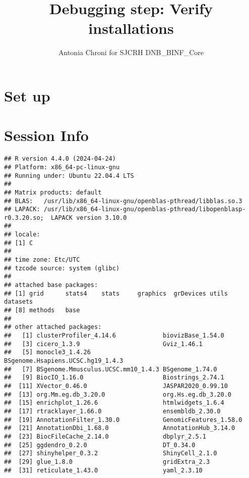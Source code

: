 \documentclass[
  11pt,
  a4paper,
]{article}
\title{Debugging step: Verify installations}
\author{Antonia Chroni for SJCRH DNB\_BINF\_Core}
\date{}
\begin{document}
\maketitle

{
\hypersetup{linkcolor=}
\setcounter{tocdepth}{2}
\tableofcontents
}
\section{Set up}\label{set-up}

\section{Session Info}\label{session-info}

\begin{verbatim}
## R version 4.4.0 (2024-04-24)
## Platform: x86_64-pc-linux-gnu
## Running under: Ubuntu 22.04.4 LTS
## 
## Matrix products: default
## BLAS:   /usr/lib/x86_64-linux-gnu/openblas-pthread/libblas.so.3 
## LAPACK: /usr/lib/x86_64-linux-gnu/openblas-pthread/libopenblasp-r0.3.20.so;  LAPACK version 3.10.0
## 
## locale:
## [1] C
## 
## time zone: Etc/UTC
## tzcode source: system (glibc)
## 
## attached base packages:
## [1] grid      stats4    stats     graphics  grDevices utils     datasets 
## [8] methods   base     
## 
## other attached packages:
##   [1] clusterProfiler_4.14.6             biovizBase_1.54.0                 
##   [3] cicero_1.3.9                       Gviz_1.46.1                       
##   [5] monocle3_1.4.26                    BSgenome.Hsapiens.UCSC.hg19_1.4.3 
##   [7] BSgenome.Mmusculus.UCSC.mm10_1.4.3 BSgenome_1.74.0                   
##   [9] BiocIO_1.16.0                      Biostrings_2.74.1                 
##  [11] XVector_0.46.0                     JASPAR2020_0.99.10                
##  [13] org.Mm.eg.db_3.20.0                org.Hs.eg.db_3.20.0               
##  [15] enrichplot_1.26.6                  htmlwidgets_1.6.4                 
##  [17] rtracklayer_1.66.0                 ensembldb_2.30.0                  
##  [19] AnnotationFilter_1.30.0            GenomicFeatures_1.58.0            
##  [21] AnnotationDbi_1.68.0               AnnotationHub_3.14.0              
##  [23] BiocFileCache_2.14.0               dbplyr_2.5.1                      
##  [25] ggdendro_0.2.0                     DT_0.34.0                         
##  [27] shinyhelper_0.3.2                  ShinyCell_2.1.0                   
##  [29] glue_1.8.0                         gridExtra_2.3                     
##  [31] reticulate_1.43.0                  yaml_2.3.10                       

\end{verbatim}
\end{document}
